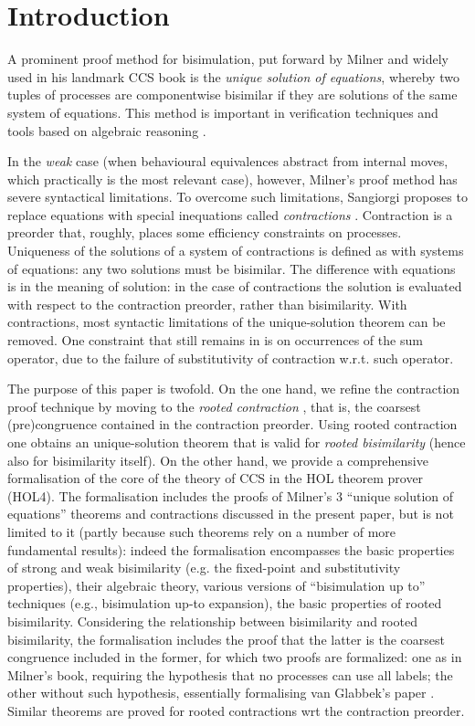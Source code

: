 \section{Introduction}

A prominent proof method for bisimulation, put forward by Milner and widely used in his
landmark CCS book \cite{Mil89} is the
\emph{unique solution of equations}, whereby two tuples of processes are
componentwise bisimilar if they are solutions 
of the same system of equations.
This method  is important in verification techniques and tools
based on algebraic reasoning \cite{theoryAndPractice,RosUnder10,BaeBOOK}. 

In the   \emph{weak} case (when  behavioural equivalences abstract from internal moves,
which practically is the most relevant case), however, 
Milner's proof method has severe syntactical limitations. 
To overcome such limitations, Sangiorgi proposes to replace
equations with  special inequations called
\emph{contractions} \cite{sangiorgi2015equations}. Contraction is a
preorder that, roughly, places some efficiency
constraints on processes.  Uniqueness of the solutions of a system of contractions
 is defined as with systems of equations:  
any two solutions must be bisimilar.
The difference with equations is in the meaning of solution:
in the case of contractions
the solution is evaluated with respect to
the contraction preorder, rather than bisimilarity. 
With contractions, most syntactic limitations of the unique-solution theorem can be
removed.  One constraint that still remains in
\cite{sangiorgi2015equations} is on occurrences of the sum operator,
due to the failure of substitutivity of contraction w.r.t. such operator.

The purpose of this paper is twofold. 
On the one hand, we refine the contraction proof technique by moving to the 
\emph{rooted contraction} \cite{Tian:2017wrba}, that is, the coarsest (pre)congruence contained in the contraction
preorder.  Using rooted contraction one obtains an unique-solution theorem that is valid for
\emph{rooted bisimilarity} (hence also for bisimilarity itself).  
On the other hand, we provide a  
 comprehensive formalisation  of the core of the theory of CCS 
 in the HOL
theorem prover (HOL4). The formalisation  includes the proofs of
Milner's 3 ``unique solution of equations'' theorems and
contractions discussed in the present paper, but is not limited to it (partly because such
theorems rely on a number of more fundamental results):
indeed the formalisation encompasses the basic properties of strong and weak
bisimilarity (e.g. the fixed-point and substitutivity properties), 
their algebraic theory, various versions of ``bisimulation up to''
techniques (e.g., bisimulation up-to expansion),
the basic properties  of rooted bisimilarity. Considering the relationship between bisimilarity and rooted
bisimilarity, the formalisation includes the proof that the latter is the coarsest
congruence included in the former, for which two proofs are formalized: one as in Milner's
book,  requiring the hypothesis that  no processes can use all labels; the other without
such hypothesis, essentially formalising van Glabbek's paper \cite{vanGlabbeek:2005ur}.
Similar theorems are proved for rooted contractions wrt the contraction preorder. 

